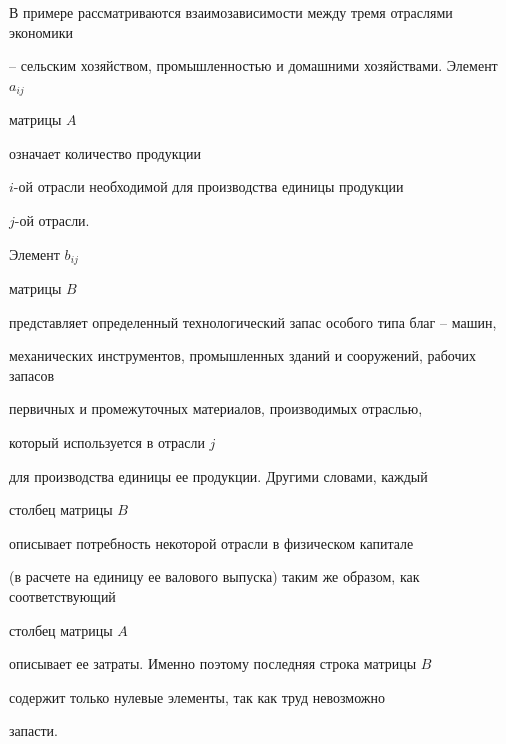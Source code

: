 \vskip 2cm











\label{end}














В примере рассматриваются взаимозависимости между тремя отраслями экономики


-- сельским хозяйством, промышленностью и домашними хозяйствами. Элемент $a_{ij}$


матрицы $A$


означает количество продукции


$i$-ой отрасли необходимой для производства единицы продукции


$j$-ой отрасли.


Элемент $b_{ij}$


матрицы $B$


представляет определенный технологический запас особого типа благ -- машин,


механических инструментов, промышленных зданий и сооружений, рабочих запасов


первичных и промежуточных материалов, производимых отраслью,


который используется в отрасли $j$


для производства единицы ее продукции. Другими словами, каждый


столбец матрицы $B$


описывает потребность некоторой отрасли в физическом капитале


(в расчете на единицу ее валового выпуска) таким же образом, как соответствующий


столбец матрицы $A$


описывает ее затраты. Именно поэтому последняя строка матрицы $B$


содержит только нулевые элементы, так как труд невозможно


запасти.





$$


